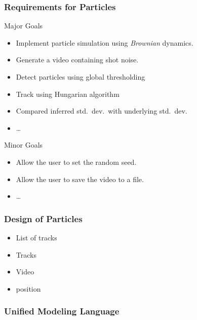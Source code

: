 \begin{frame}[fragile]
\frametitle{Requirements for Particles}

\begin{block}{Major Goals}


\begin{itemize}
\item Implement particle simulation using \textit{Brownian} dynamics.
\item Generate a video containing shot noise.
\item Detect particles using global thresholding
\item Track using Hungarian algorithm
\item Compared inferred std.\ dev.\ with underlying std.\ dev.
\item \ldots
\end{itemize}
\end{block}
\begin{block}{Minor Goals}

\begin{itemize}
\item Allow the user to set the random seed.
\item Allow the user to save the video to a file.
\item \ldots
\end{itemize}
\end{block}
\end{frame}

\begin{frame}[fragile]
\frametitle{Design of Particles}

\begin{itemize}
\item List of tracks 
\item Tracks 
\item Video 
\item position 
\end{itemize}
\end{frame}

\begin{frame}[fragile]
\frametitle{Unified Modeling Language}

\end{frame}

